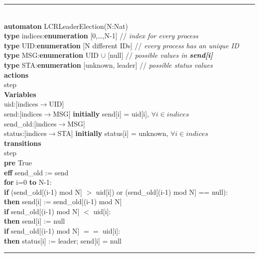 \documentclass[11pt]{article}
\newcommand{\tab}{\hspace*{5mm}}
\begin{document}
\noindent\rule{7cm}{1.0pt}\\
\textbf{automaton} LCRLeaderElection(N:Nat)\\
\tab\textbf{type} indices:\textbf{enumeration} [0,\dots,N-1] // \textit{index for every process}\\
\tab\textbf{type} UID:\textbf{enumeration} [N different IDs] // \textit{every process has an unique ID} \\
\tab\textbf{type} MSG:\textbf{enumeration} UID $\cup$ [null] // \textit{possible values in \textbf{send[i]}}\\
\tab\textbf{type} STA:\textbf{enumeration} [unknown, leader] // \textit{possible status values}\\
\tab\textbf{actions}\\
\tab\tab step\\
\tab\textbf{Variables}\\
\tab\tab uid:[indices$\rightarrow$UID]\\
\tab\tab send:[indices$\rightarrow$MSG] \textbf{initially} send[i] = uid[i], $\forall i \in indices$\\
\tab\tab send\_old:[indices$\rightarrow$MSG]\\
\tab\tab status:[indices$\rightarrow$STA] \textbf{initially} status[i] = unknown, $\forall i \in indices$\\
\tab\textbf{transitions}\\
\tab\tab step\\
\tab\tab\tab\textbf{pre} True\\
\tab\tab\tab\textbf{eff} send\_old := send\\
\tab\tab\tab\tab \textbf{for} i=0 \textbf{to} N-1:\\
\tab\tab\tab\tab\tab\textbf{if} (send\_old[(i-1) mod N] $>$ uid[i]) or (send\_old[(i-1) mod N] == null):\\
\tab\tab\tab\tab\tab\textbf{then} send[i] := send\_old[(i-1) mod N]\\
\tab\tab\tab\tab\tab\textbf{if} send\_old[(i-1) mod N] $<$ uid[i]:\\
\tab\tab\tab\tab\tab\textbf{then} send[i] := null\\
\tab\tab\tab\tab\tab\textbf{if} send\_old[(i-1) mod N] $==$ uid[i]:\\
\tab\tab\tab\tab\tab\textbf{then} status[i] := leader; send[i] = null\\

\noindent\rule{7cm}{1.0pt}
\end{document}
